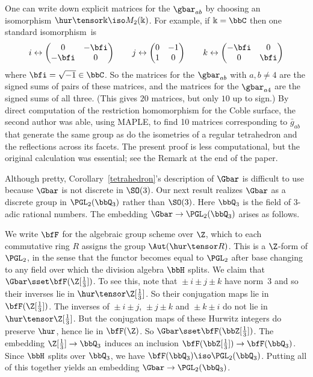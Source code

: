 \goodbreak
\begin{rema}\label{RemMatrices}
One can write down explicit matrices for the $\gbar_{ab}$ by choosing an isomorphism $\hur\tensor\Bbbk\iso M_2(\Bbbk)$. For example, if $\Bbbk=\bbC$ then one standard isomorphism~is
\begin{equation*}
i\leftrightarrow
\begin{pmatrix}0&-\bfi\\-\bfi&0
\end{pmatrix}
\qquad j\leftrightarrow
\begin{pmatrix}0&-1\\1&0
\end{pmatrix}
\qquad k\leftrightarrow
\begin{pmatrix}-\bfi&0\\0&\bfi
\end{pmatrix}
\end{equation*}
where $\bfi=\sqrt{-1}\in\bbC$. So the matrices for the $\gbar_{ab}$ with $a,b\neq4$ are the signed sums of pairs of these matrices, and the matrices for the $\gbar_{a4}$ are the signed sums of all three. (This gives $20$ matrices, but only $10$ up to sign.) By direct computation of the restriction homomorphism for the Coble surface, the second author was able, using MAPLE, to find 10 matrices corresponding to $\bar{g}_{ab}$ that generate the same group as do the isometries of a regular tetrahedron and the reflections across its facets. The present proof is less computational, but the original calculation was essential; see the Remark at the end of the paper.
\end{rema}


Although pretty, Corollary~\ref{tetrahedron}'s description of $\Gbar$ is difficult to use because $\Gbar$ is not discrete in $\SO(3)$. Our next result realizes $\Gbar$ as a discrete group in $\PGL_2(\bbQ_3)$ rather than $\SO(3)$. Here $\bbQ_3$ is the field of $3$-adic rational numbers. The embedding $\Gbar\to\PGL_2(\bbQ_3)$ arises as follows.

We write $\bfF$ for the algebraic group scheme over $\Z$, which to each commutative ring $R$ assigns the group $\Aut(\hur\tensor R)$. This is a $\Z$-form of $\PGL_2$, in the sense that the functor becomes equal to $\PGL_2$ after base changing to any field over which the division algebra $\bbH$ splits. We claim that $\Gbar\sset\bfF(\Z[\frac13])$. To see this, note that ${ }\pm i\pm j\pm k$ have norm~$3$ and so their inverses lie in $\hur\tensor\Z[\frac13]$. So their conjugation maps lie in $\bfF(\Z[\frac13])$. The inverses of ${ }\pm i\pm j$, ${ }\pm j\pm k$ and ${ }\pm k\pm i$ do not lie in $\hur\tensor\Z[\frac13]$. But the conjugation maps of these Hurwitz integers do preserve $\hur$, hence lie in $\bfF(\Z)$. So $\Gbar\sset\bfF(\bbZ[\frac13])$. The embedding $\Z[\frac13]\to\bbQ_3$ induces an inclusion $\bfF(\bbZ[\frac13])\to\bfF(\bbQ_3)$. Since $\bbH$ splits over $\bbQ_3$, we have $\bfF(\bbQ_3)\iso\PGL_2(\bbQ_3)$. Putting all of this together yields an embedding $\Gbar\to\PGL_2(\bbQ_3)$.

